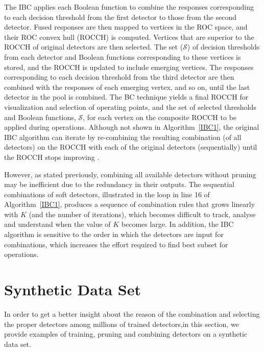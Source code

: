 



The IBC applies each Boolean function to combine the responses corresponding to each decision threshold from the first detector to those from the second detector.
Fused responses are then mapped to vertices in the ROC space, and their ROC convex hull (ROCCH) is computed.
Vertices that are superior to the ROCCH of original detectors are then selected.
The set ($\mathcal{S}$) of decision thresholds from each detector and Boolean functions corresponding to these vertices is stored, and the ROCCH is updated to include emerging vertices.
The responses corresponding to each decision threshold from the third detector are then combined with the responses of each emerging vertex, and so on, until the last detector in the pool is combined.
The BC technique yields a final ROCCH for visualization and selection of operating points, and the set of selected thresholds and Boolean functions, $\mathcal{S}$, for each vertex on the composite ROCCH to be applied during operations.
Although not shown in Algorithm~\ref{IBC1}, the original IBC algorithm can iterate by re-combining the resulting combination (of all detectors) on the ROCCH with each of the original detectors (sequentially) until the ROCCH stops improving \cite{Khreich2010-ICPR}.

However, as stated previously, combining all available detectors without pruning may be inefficient due to the redundancy in their outputs.
The sequential combinations of soft detectors, illustrated in the loop in line 16 of Algorithm~\ref{IBC1}, produces a sequence of combination rules that grows linearly with $K$ (and the number of iterations), which becomes difficult to track, analyse and understand when the value of $K$ becomes large.
In addition, the IBC algorithm is sensitive to the order in which the detectors are input for combinations, which increases the effort required to find best subset for operations.

 \section{Synthetic Data Set}
\label{sec:synthetic}

In order to get a better insight about the reason of the combination and selecting the proper detectors among millions of trained detectors,in this section, we provide examples of training, pruning and combining detectors on a synthetic data set. 

